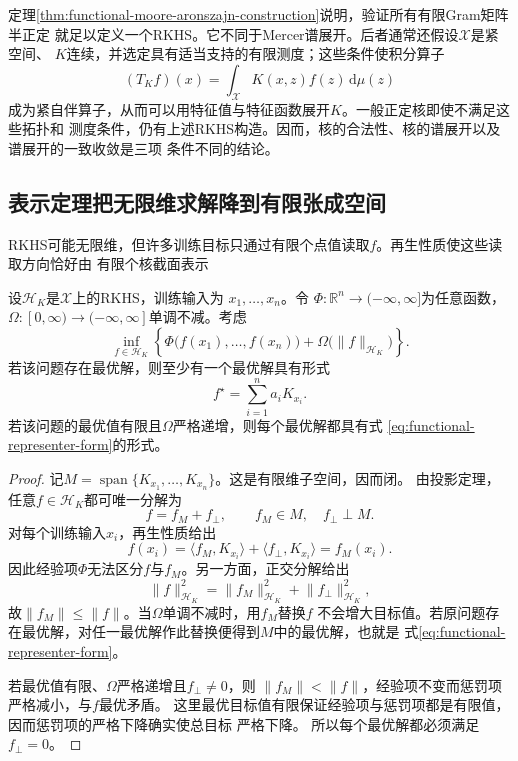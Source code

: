 定理\ref{thm:functional-moore-aronszajn-construction}说明，验证所有有限Gram矩阵半正定
就足以定义一个RKHS。它不同于Mercer谱展开。后者通常还假设$\mathcal{X}$是紧空间、
$K$连续，并选定具有适当支持的有限测度；这些条件使积分算子
\[
  (T_Kf)(x)
  =
  \int_{\mathcal{X}}K(x,z)f(z)\,\mathrm{d}\mu(z)
\]
成为紧自伴算子，从而可以用特征值与特征函数展开$K$。一般正定核即使不满足这些拓扑和
测度条件，仍有上述RKHS构造。因而，核的合法性、核的谱展开以及谱展开的一致收敛是三项
条件不同的结论。

\subsection{表示定理把无限维求解降到有限张成空间}

RKHS可能无限维，但许多训练目标只通过有限个点值读取$f$。再生性质使这些读取方向恰好由
有限个核截面表示

\begin{theorem}[有限样本表示定理]
\label{thm:functional-representer-theorem}
设$\mathcal{H}_K$是$\mathcal{X}$上的RKHS，训练输入为
$x_1,\ldots,x_n$。令
$\Phi:\mathbb{R}^n\to(-\infty,\infty]$为任意函数，
$\Omega:[0,\infty)\to(-\infty,\infty]$单调不减。考虑
\begin{equation}
  \inf_{f\in\mathcal{H}_K}
  \left\{
    \Phi\bigl(f(x_1),\ldots,f(x_n)\bigr)
    +
    \Omega\bigl(\lVert f\rVert_{\mathcal{H}_K}\bigr)
  \right\}.
  \label{eq:functional-representer-objective}
\end{equation}
若该问题存在最优解，则至少有一个最优解具有形式
\begin{equation}
  f^\star
  =
  \sum_{i=1}^{n}a_iK_{x_i}.
  \label{eq:functional-representer-form}
\end{equation}
若该问题的最优值有限且$\Omega$严格递增，则每个最优解都具有式
\eqref{eq:functional-representer-form}的形式。
\end{theorem}

\begin{proof}
记$M=\operatorname{span}\{K_{x_1},\ldots,K_{x_n}\}$。这是有限维子空间，因而闭。
由投影定理，任意$f\in\mathcal{H}_K$都可唯一分解为
\[
  f=f_M+f_{\perp},\qquad f_M\in M,\quad f_{\perp}\perp M.
\]
对每个训练输入$x_i$，再生性质给出
\[
  f(x_i)
  =
  \langle f_M,K_{x_i}\rangle
  +
  \langle f_{\perp},K_{x_i}\rangle
  =
  f_M(x_i).
\]
因此经验项$\Phi$无法区分$f$与$f_M$。另一方面，正交分解给出
\[
  \lVert f\rVert_{\mathcal{H}_K}^2
  =
  \lVert f_M\rVert_{\mathcal{H}_K}^2
  +
  \lVert f_{\perp}\rVert_{\mathcal{H}_K}^2,
\]
故$\lVert f_M\rVert\leq\lVert f\rVert$。当$\Omega$单调不减时，用$f_M$替换$f$
不会增大目标值。若原问题存在最优解，对任一最优解作此替换便得到$M$中的最优解，也就是
式\eqref{eq:functional-representer-form}。

若最优值有限、$\Omega$严格递增且$f_{\perp}\neq0$，则
$\lVert f_M\rVert<\lVert f\rVert$，经验项不变而惩罚项严格减小，与$f$最优矛盾。
这里最优目标值有限保证经验项与惩罚项都是有限值，因而惩罚项的严格下降确实使总目标
严格下降。
所以每个最优解都必须满足$f_{\perp}=0$。
\end{proof}

